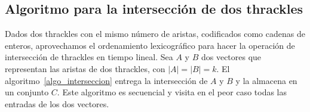 \subsection{Algoritmo para la intersección de dos thrackles}
  Dados dos thrackles con el mismo número de aristas, codificados como cadenas
  de enteros, aprovechamos el ordenamiento lexicográfico para hacer la
  operación de intersección de thrackles en tiempo lineal.
  Sea $A$ y $B$ dos vectores que representan las aristas de dos thrackles, con
  $|A|=|B|=k$. El algoritmo~\ref{algo_interseccion} entrega la intersección de $A$ y $B$ y la
  almacena en un conjunto $C$. Este algoritmo es secuencial y visita en el peor caso todas las
  entradas de los dos vectores.

